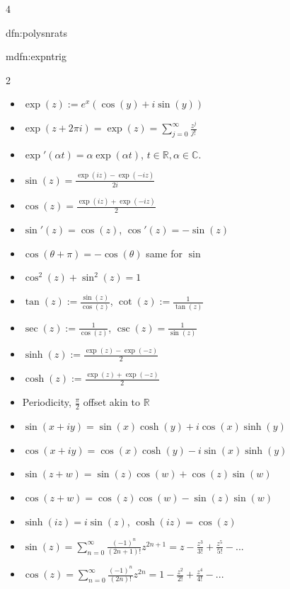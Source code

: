 \documentclass[landscape, 8pt]{extarticle}
\begin{document}
\begin{multicols*}{4}
\begin{dfn}{dfn:polysnrats}{ }
		\end{dfn}
		
		
		\begin{mdfn}{mdfn:expntrig}{ }
			\vspace{-5pt}
			\begin{multicols}{2}
				\begin{itemize}
					\item $\exp(z) := e^x(\cos(y) + i\sin(y))$
					\item $\exp(z + 2 \pi i) = \exp(z) = \sum_{j=0}^{\infty} \frac{z^j}{j!}$
					\item $\exp'(\alpha t) = \alpha \exp(\alpha t)$, $t\in \mathbb{R}, \alpha\in \mathbb{C}$.
					\item $\sin(z) = \frac{\exp(iz) - \exp(-iz)}{2i}$
					\item $\cos(z) = \frac{\exp(iz) + \exp(-iz)}{2}$
					\item $\sin'(z) = \cos(z)$, $\cos'(z) = -\sin(z)$
					\item $\cos(\theta + \pi) = -\cos(\theta)$ same for $\sin$
				\end{itemize}
				
				\columnbreak
				
				\begin{itemize}
					\item $\cos^2(z) + \sin^2(z) = 1$
					\item $\tan(z) := \frac{\sin(z)}{\cos(z)}$, $\cot(z):= \frac{1}{\tan(z)}$ 
					\item $\sec(z) := \frac{1}{\cos(z)}$, $\csc(z) = \frac{1}{\sin(z)}$
					\item $\sinh(z) := \frac{\exp(z) - \exp(-z)}{2}$
					\item $\cosh(z) := \frac{\exp(z) + \exp(-z)}{2}$
					\item Periodicity, $\frac{\pi}{2}$ offset akin to $\mathbb{R}$
				\end{itemize}
				
			\end{multicols}
			
			\vspace{-11pt}
			
			\begin{itemize}
				\item $\sin(x + iy) = \sin(x)\cosh(y) + i\cos(x)\sinh(y)$
				\item $\cos(x+iy) = \cos(x)\cosh(y) - i\sin(x)\sinh(y)$
				\item $\sin(z+w) = \sin(z)\cos(w) + \cos(z)\sin(w)$
				\item $\cos(z+w) = \cos(z)\cos(w) - \sin(z)\sin(w)$
				\item $\sinh(iz) = i\sin(z)$, $\cosh(iz) = \cos(z)$
				\item $\sin(z) = \sum_{n=0}^{\infty} \frac{(-1)^n}{(2n+1)!}z^{2n+1} = z-\frac{z^3}{3!} + \frac{z^5}{5!} - ...$
				\item $\cos(z) = \sum_{n=0}^{\infty} \frac{(-1)^n}{(2n)!}z^{2n} = 1 - \frac{z^2}{2!} + \frac{z^4}{4!} - ...$
			\end{itemize}
			

\end{mdfn}
\end{multicols*}
\end{document}
